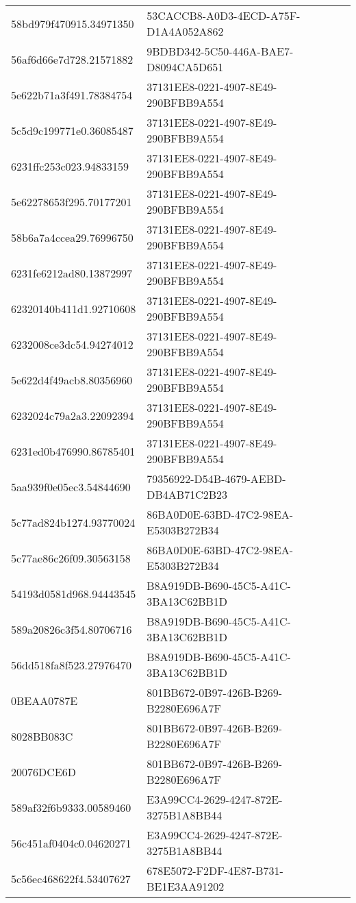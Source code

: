 \begin{tabular}{ll}
58bd979f470915.34971350 & 53CACCB8-A0D3-4ECD-A75F-D1A4A052A862 \\
56af6d66e7d728.21571882 & 9BDBD342-5C50-446A-BAE7-D8094CA5D651 \\
5e622b71a3f491.78384754 & 37131EE8-0221-4907-8E49-290BFBB9A554 \\
5c5d9c199771e0.36085487 & 37131EE8-0221-4907-8E49-290BFBB9A554 \\
6231ffc253c023.94833159 & 37131EE8-0221-4907-8E49-290BFBB9A554 \\
5e62278653f295.70177201 & 37131EE8-0221-4907-8E49-290BFBB9A554 \\
58b6a7a4ccea29.76996750 & 37131EE8-0221-4907-8E49-290BFBB9A554 \\
6231fe6212ad80.13872997 & 37131EE8-0221-4907-8E49-290BFBB9A554 \\
62320140b411d1.92710608 & 37131EE8-0221-4907-8E49-290BFBB9A554 \\
6232008ce3dc54.94274012 & 37131EE8-0221-4907-8E49-290BFBB9A554 \\
5e622d4f49acb8.80356960 & 37131EE8-0221-4907-8E49-290BFBB9A554 \\
6232024c79a2a3.22092394 & 37131EE8-0221-4907-8E49-290BFBB9A554 \\
6231ed0b476990.86785401 & 37131EE8-0221-4907-8E49-290BFBB9A554 \\
5aa939f0e05ec3.54844690 & 79356922-D54B-4679-AEBD-DB4AB71C2B23 \\
5c77ad824b1274.93770024 & 86BA0D0E-63BD-47C2-98EA-E5303B272B34 \\
5c77ae86c26f09.30563158 & 86BA0D0E-63BD-47C2-98EA-E5303B272B34 \\
54193d0581d968.94443545 & B8A919DB-B690-45C5-A41C-3BA13C62BB1D \\
589a20826c3f54.80706716 & B8A919DB-B690-45C5-A41C-3BA13C62BB1D \\
56dd518fa8f523.27976470 & B8A919DB-B690-45C5-A41C-3BA13C62BB1D \\
0BEAA0787E & 801BB672-0B97-426B-B269-B2280E696A7F \\
8028BB083C & 801BB672-0B97-426B-B269-B2280E696A7F \\
20076DCE6D & 801BB672-0B97-426B-B269-B2280E696A7F \\
589af32f6b9333.00589460 & E3A99CC4-2629-4247-872E-3275B1A8BB44 \\
56c451af0404c0.04620271 & E3A99CC4-2629-4247-872E-3275B1A8BB44 \\
5c56ec468622f4.53407627 & 678E5072-F2DF-4E87-B731-BE1E3AA91202 \\

\end{tabular}
